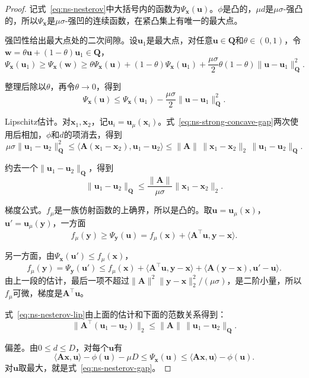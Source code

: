 \begin{proof}
记式~\eqref{eq:ns-nesterov}中大括号内的函数为$\Psi_{\bm{x}}(\bm{u})$。$\phi$是凸的，$\mu d$是$\mu\sigma$-强凸的，所以$\Psi_{\bm{x}}$是$\mu\sigma$-强凹的连续函数，在紧凸集上有唯一的最大点。

强凹性给出最大点处的二次间隙。设$\bm{u}_1$是最大点，对任意$\bm{u}\in\bm{Q}$和$\theta\in(0,1)$，令$\bm{w}=\theta\bm{u}+(1-\theta)\bm{u}_1\in\bm{Q}$，
\[
 \Psi_{\bm{x}}(\bm{u}_1)\geq\Psi_{\bm{x}}(\bm{w})\geq\theta\Psi_{\bm{x}}(\bm{u})+(1-\theta)\Psi_{\bm{x}}(\bm{u}_1)+\frac{\mu\sigma}{2}\theta(1-\theta)\lVert\bm{u}-\bm{u}_1\rVert_{\bm{Q}}^2.
\]

整理后除以$\theta$，再令$\theta\to0$，得到
\begin{equation}
 \Psi_{\bm{x}}(\bm{u})\leq\Psi_{\bm{x}}(\bm{u}_1)-\frac{\mu\sigma}{2}\lVert\bm{u}-\bm{u}_1\rVert_{\bm{Q}}^2.
 \label{eq:ns-strong-concave-gap}
\end{equation}

Lipschitz估计。对$\bm{x}_1,\bm{x}_2$，记$\bm{u}_i=\bm{u}_\mu(\bm{x}_i)$。式~\eqref{eq:ns-strong-concave-gap}两次使用后相加，$\phi$和$d$的项消去，得到
\[
 \mu\sigma\lVert\bm{u}_1-\bm{u}_2\rVert_{\bm{Q}}^2\leq\langle\bm{A}(\bm{x}_1-\bm{x}_2),\bm{u}_1-\bm{u}_2\rangle\leq\lVert\bm{A}\rVert\,\lVert\bm{x}_1-\bm{x}_2\rVert_2\,\lVert\bm{u}_1-\bm{u}_2\rVert_{\bm{Q}}.
\]

约去一个$\lVert\bm{u}_1-\bm{u}_2\rVert_{\bm{Q}}$，得到
\[
 \lVert\bm{u}_1-\bm{u}_2\rVert_{\bm{Q}}\leq\frac{\lVert\bm{A}\rVert}{\mu\sigma}\lVert\bm{x}_1-\bm{x}_2\rVert_2.
\]

梯度公式。$f_\mu$是一族仿射函数的上确界，所以是凸的。取$\bm{u}=\bm{u}_\mu(\bm{x})$，$\bm{u}'=\bm{u}_\mu(\bm{y})$，一方面
\[
 f_\mu(\bm{y})\geq\Psi_{\bm{y}}(\bm{u})=f_\mu(\bm{x})+\langle\bm{A}^\top\bm{u},\bm{y}-\bm{x}\rangle.
\]

另一方面，由$\Psi_{\bm{x}}(\bm{u}')\leq f_\mu(\bm{x})$，
\[
 f_\mu(\bm{y})=\Psi_{\bm{y}}(\bm{u}')\leq f_\mu(\bm{x})+\langle\bm{A}^\top\bm{u},\bm{y}-\bm{x}\rangle+\langle\bm{A}(\bm{y}-\bm{x}),\bm{u}'-\bm{u}\rangle.
\]
由上一段的估计，最后一项不超过$\lVert\bm{A}\rVert^2\lVert\bm{y}-\bm{x}\rVert_2^2/(\mu\sigma)$，是二阶小量，所以$f_\mu$可微，梯度是$\bm{A}^\top\bm{u}$。

式~\eqref{eq:ns-nesterov-lip}由上面的估计和下面的范数关系得到：
\[
 \lVert\bm{A}^\top(\bm{u}_1-\bm{u}_2)\rVert_2\leq\lVert\bm{A}\rVert\,\lVert\bm{u}_1-\bm{u}_2\rVert_{\bm{Q}}.
\]

偏差。由$0\leq d\leq D$，对每个$\bm{u}$有
\[
 \langle\bm{A}\bm{x},\bm{u}\rangle-\phi(\bm{u})-\mu D\leq\Psi_{\bm{x}}(\bm{u})\leq\langle\bm{A}\bm{x},\bm{u}\rangle-\phi(\bm{u}).
\]
对$\bm{u}$取最大，就是式~\eqref{eq:ns-nesterov-gap}。
\end{proof}

